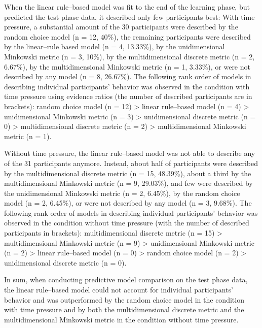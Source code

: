 \documentclass[a4paper,man,natbib]{apa6}
\begin{document}
When the linear rule--based model was fit to the end of the learning phase, but predicted the test phase data, it described only few participants best: With time pressure, a substantial amount of the 30 participants were described by the random choice model (n = 12, 40\%), the remaining participants were described by the linear--rule based model (n = 4, 13.33\%), by the unidimensional Minkowski metric (n = 3, 10\%), by the multidimensional discrete metric (n = 2, 6.67\%), by the multidimensional Minkowski metric (n = 1, 3.33\%), or were not described by any model (n = 8, 26.67\%). The following rank order of models in describing individual participants' behavior was observed in the condition with time pressure using evidence ratios (the number of described participants are in brackets): random choice model (n = 12) > linear rule--based model (n = 4) > unidimensional Minkowski metric (n = 3) > unidimensional discrete metric (n = 0) > multidimensional discrete metric (n = 2) > multidimensional Minkowski metric (n = 1). 

Without time pressure, the linear rule--based model was not able to describe any of the 31 participants anymore. Instead, about half of participants were described by the multidimensional discrete metric (n = 15, 48.39\%), about a third by the multidimensional Minkowski metric (n = 9, 29.03\%), and few were described by the unidimensional Minkowski metric (n = 2, 6.45\%), by the random choice model (n = 2, 6.45\%), or were not described by any model (n = 3, 9.68\%). The following rank order of models in describing individual participants' behavior was observed in the condition without time pressure (with the number of described participants in brackets): multidimensional discrete metric (n = 15) > multidimensional Minkowski metric (n = 9) > unidimensional Minkowski metric (n = 2) > linear rule--based model (n = 0) > random choice model (n = 2) > unidimensional discrete metric (n = 0). 

In sum, when conducting predictive model comparison on the test phase data, the linear rule--based model could not account for individual participants' behavior and was outperformed by the random choice model in the condition with time pressure and by both the multidimensional discrete metric and the multidimensional Minkowski metric in the condition without time pressure.

\end{document}

